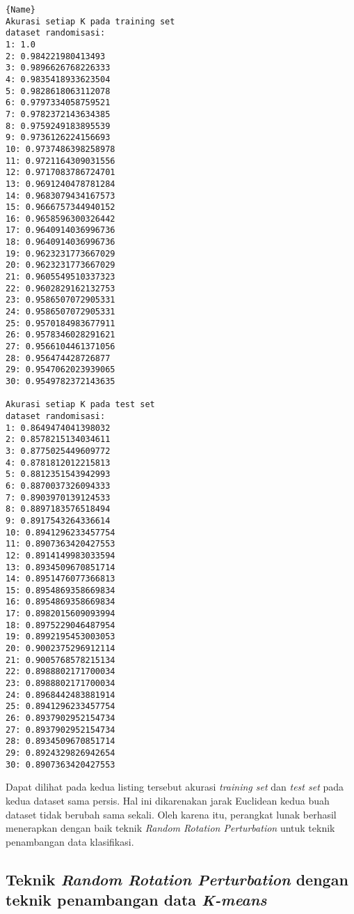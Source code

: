 \begin{minipage}{.48\textwidth}
\begin{lstlisting}[caption=Akurasi Dataset Randomisasi,frame=tlrb, label=diabetes_akurasi_randomisasi]{Name}
Akurasi setiap K pada training set 
dataset randomisasi: 
1: 1.0
2: 0.984221980413493
3: 0.9896626768226333
4: 0.9835418933623504
5: 0.9828618063112078
6: 0.9797334058759521
7: 0.9782372143634385
8: 0.9759249183895539
9: 0.9736126224156693
10: 0.9737486398258978
11: 0.9721164309031556
12: 0.9717083786724701
13: 0.9691240478781284
14: 0.9683079434167573
15: 0.9666757344940152
16: 0.9658596300326442
17: 0.9640914036996736
18: 0.9640914036996736
19: 0.9623231773667029
20: 0.9623231773667029
21: 0.9605549510337323
22: 0.9602829162132753
23: 0.9586507072905331
24: 0.9586507072905331
25: 0.9570184983677911
26: 0.9578346028291621
27: 0.9566104461371056
28: 0.956474428726877
29: 0.9547062023939065
30: 0.9549782372143635

Akurasi setiap K pada test set 
dataset randomisasi: 
1: 0.8649474041398032
2: 0.8578215134034611
3: 0.8775025449609772
4: 0.8781812012215813
5: 0.8812351543942993
6: 0.8870037326094333
7: 0.8903970139124533
8: 0.8897183576518494
9: 0.8917543264336614
10: 0.8941296233457754
11: 0.8907363420427553
12: 0.8914149983033594
13: 0.8934509670851714
14: 0.8951476077366813
15: 0.8954869358669834
16: 0.8954869358669834
17: 0.8982015609093994
18: 0.8975229046487954
19: 0.8992195453003053
20: 0.9002375296912114
21: 0.9005768578215134
22: 0.8988802171700034
23: 0.8988802171700034
24: 0.8968442483881914
25: 0.8941296233457754
26: 0.8937902952154734
27: 0.8937902952154734
28: 0.8934509670851714
29: 0.8924329826942654
30: 0.8907363420427553
\end{lstlisting}
\end{minipage}

Dapat dilihat pada kedua listing tersebut akurasi \textit{training set} dan \textit{test set} pada kedua dataset sama persis. Hal ini dikarenakan jarak Euclidean kedua buah dataset tidak berubah sama sekali. Oleh karena itu, perangkat lunak berhasil menerapkan dengan baik teknik \textit{Random Rotation Perturbation} untuk teknik penambangan data klasifikasi.

\subsection{Teknik \textit{Random Rotation Perturbation} dengan teknik penambangan data \textit{K-means}}
\label{sec:rrp-kmeans}

